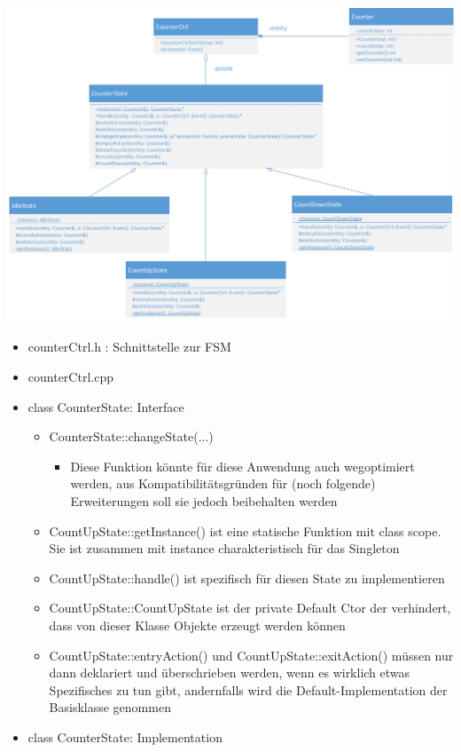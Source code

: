 \begin{center}
\includegraphics[width=0.7\linewidth]{./images/FSM/klassendiagramm}
\end{center}

\begin{itemize}
\item counterCtrl.h : Schnittstelle zur FSM


\item counterCtrl.cpp


\item class CounterState: Interface

\begin{itemize}
  \item CounterState::changeState(...)
  \begin{itemize}
    \item Diese Funktion könnte für diese Anwendung auch wegoptimiert werden, aus Kompatibilitätsgründen für (noch folgende) Erweiterungen soll sie jedoch beibehalten werden
  \end{itemize}
  \item CountUpState::getInstance() ist eine statische Funktion mit class scope. Sie ist zusammen mit instance charakteristisch für das Singleton
  \item CountUpState::handle() ist spezifisch für diesen State zu implementieren
  \item CountUpState::CountUpState ist der private Default Ctor der verhindert, dass von dieser Klasse Objekte erzeugt werden können
  \item CountUpState::entryAction() und CountUpState::exitAction() müssen nur dann deklariert und überschrieben werden, wenn es wirklich etwas Spezifisches zu tun gibt, andernfalls wird die Default-Implementation der Basisklasse genommen
  \end{itemize}
\item class CounterState: Implementation

\end{itemize}

